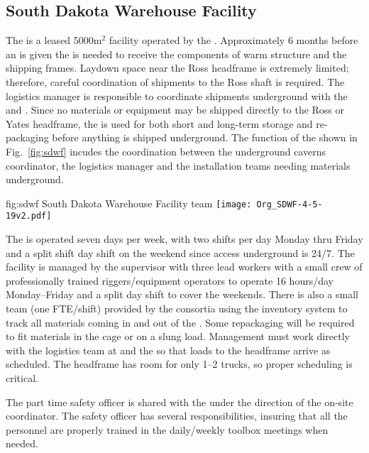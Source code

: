 \subsection{South Dakota Warehouse Facility}

The  is a leased 5000m$^2$ facility operated by the
.  Approximately 6 months before an  is given
the  is needed to receive the components of warm structure
and the  shipping frames. Laydown space near the Ross
headframe is extremely limited; therefore, careful coordination of
shipments to the Ross shaft is required. The  logistics
manager is responsible to coordinate shipments underground with the
 and . Since no materials or equipment may be
shipped directly to the Ross or Yates headframe, the  is
used for both short and long-term storage and re-packaging before
anything is shipped underground. The function of the 
shown in Fig.~\ref{fig:sdwf} incudes the coordination between the
underground caverns coordinator, the logistics manager and the
installation teams needing materials underground.
\begin{dunefigure}{fig:sdwf}
  {South Dakota Warehouse Facility team}
  \texttt{[image: Org\_SDWF-4-5-19v2.pdf]}
\end{dunefigure}

The  is operated seven days per week, with two shifts per
day Monday thru Friday and a split shift day shift on the weekend
since access underground is 24/7. The facility is managed by the
 supervisor with three lead workers with a small
 crew of professionally trained riggers/equipment operators
to operate 16 hours/day Monday--Friday and a split day shift to cover
the weekends.  There is also a small team (one FTE/shift) provided by
the consortia using the inventory system to track all materials coming
in and out of the . Some repackaging will be required to
fit materials in the cage or on a slung load.  Management must work
directly with the  logistics team at  and the
 so that loads to the headframe arrive as scheduled. The
headframe has room for only 1--2 trucks, so proper scheduling is
critical.

The part time safety officer is shared with the  under the
direction of the on-site  coordinator.  The safety officer
has several responsibilities, insuring that all the 
personnel are properly trained in the daily/weekly toolbox meetings
when needed.


